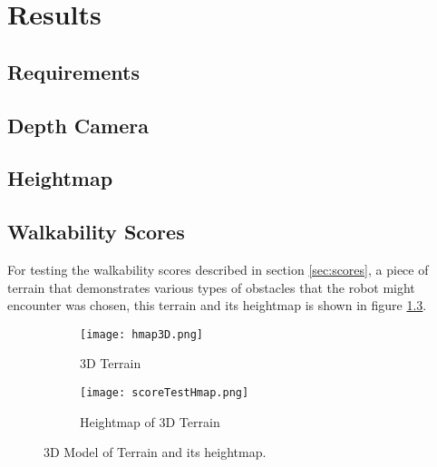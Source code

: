 \chapter{Results}

\section{Requirements}

\section{Depth Camera}

\section{Heightmap}

\section{Walkability Scores}
    For testing the walkability scores described in section \ref{sec:scores}, a piece of terrain that demonstrates various types of obstacles
    that the robot might encounter was chosen, this terrain and its heightmap is shown in figure \ref{fig:score_test_map}.
    \begin{figure}[h]
        \centering
        \begin{subfigure}{.5\textwidth}
            \texttt{[image: hmap3D.png]}
            \caption{3D Terrain}
            \label{fig:sub_3d_terrain}
        \end{subfigure}%
        \begin{subfigure}{.5\textwidth}
            \texttt{[image: scoreTestHmap.png]}
            \caption{Heightmap of 3D Terrain}
            \label{fig:sub_3d_terrain_hmap}
        \end{subfigure}
        \caption{3D Model of Terrain and its heightmap.}
        \label{fig:score_test_map}
    \end{figure}

